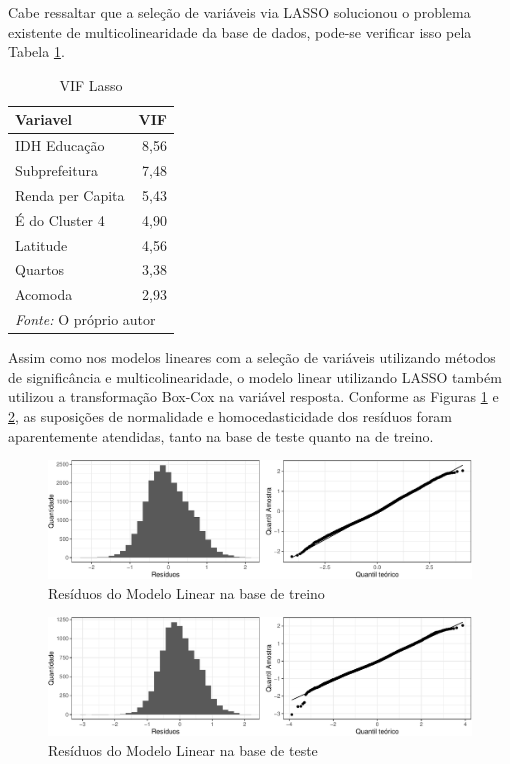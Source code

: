 \documentclass[
	12pt,				%
	a4paper,		%
	oneside,    %
	chapter=TITLE,		   %
	section=TITLE,		   %
	subsection=TITLE,	   %
	subsubsection=TITLE, %
	english,			%
	french,				%
	spanish,			%
	brazil,				%
]{abntex2}
\begin{document}
Cabe ressaltar que a seleção de variáveis via LASSO solucionou o
problema existente de multicolinearidade da base de dados, pode-se
verificar isso pela Tabela \ref{tab:vif_lasso}.

\begin{table}

\caption{\label{tab:vif_lasso}VIF Lasso}
\centering
\begin{tabular}[t]{l|r}
\hline
Variavel & VIF\\
\hline
IDH Educação & 8,56\\
\hline
Subprefeitura & 7,48\\
\hline
Renda per Capita & 5,43\\
\hline
É do Cluster 4 & 4,90\\
\hline
Latitude & 4,56\\
\hline
Quartos & 3,38\\
\hline
Acomoda & 2,93\\
\hline
\multicolumn{2}{l}{\textit{Fonte: } O próprio autor}\\
\end{tabular}
\end{table}

Assim como nos modelos lineares com a seleção de variáveis utilizando
métodos de significância e multicolinearidade, o modelo linear
utilizando LASSO também utilizou a transformação Box-Cox na variável
resposta. Conforme as Figuras \ref{resid_lasso} e
\ref{resid_lasso_test}, as suposições de normalidade e homocedasticidade
dos resíduos foram aparentemente atendidas, tanto na base de teste
quanto na de treino.

\begin{figure}
\centering
\includegraphics{00-TCC_files/figure-latex/resid_lasso-1.pdf}
\caption{\label{resid_lasso}Resíduos do Modelo Linear na base de treino}
\end{figure}

\begin{figure}
\centering
\includegraphics{00-TCC_files/figure-latex/resid_lasso_test-1.pdf}
\caption{\label{resid_lasso_test}Resíduos do Modelo Linear na base de
teste}
\end{figure}
\end{document}
